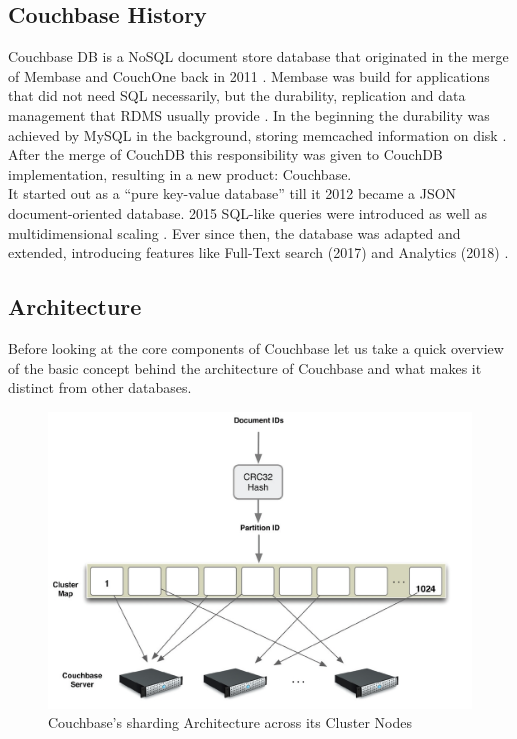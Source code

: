 \subsection{Couchbase History}
Couchbase DB is a NoSQL document store database that originated in the merge of Membase and CouchOne back in 2011 \parencite{couchbaseWeb}. Membase was build for applications that did not need SQL necessarily, but the durability, replication and data management that RDMS usually provide \parencite{ingenthron}. In the beginning the durability was achieved by MySQL in the background, storing memcached information on disk \parencite{popescuBacalu}. After the merge of CouchDB this responsibility was given to CouchDB implementation, resulting in a new product: Couchbase.\\
It started out as a “pure key-value database” \parencite{couchbaseAbout} till it 2012 became a JSON document-oriented database. 2015 SQL-like queries were introduced as well as multidimensional scaling \parencite{couchbaseAbout}. Ever since then, the database was adapted and extended, introducing features like Full-Text search (2017) and Analytics (2018) \parencite{couchbaseAbout}.

\subsection{Architecture}
Before looking at the core components of Couchbase let us take a quick overview of the basic concept behind the architecture of Couchbase and what makes it distinct from other databases.

\begin{figure}[H]
    \includegraphics[width=\textwidth]{img/couchbaseClusterMap.jpg}
    \caption{Couchbase's sharding Architecture across its Cluster Nodes}
    \label{couchbase:figure:Architecture}
\end{figure}

